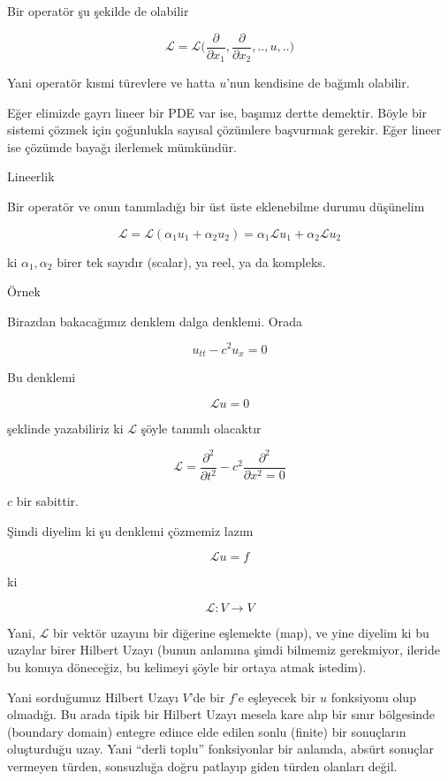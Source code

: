 \documentclass[12pt,fleqn]{article}\usepackage{../../common}
\begin{document}
Bir operatör şu şekilde de olabilir

$$ \mathcal{L} = \mathcal{L} \bigg(
\frac{\partial }{\partial x_1}, \frac{\partial }{\partial x_2},..,
u,..
\bigg)
 $$

Yani operatör kısmi türevlere ve hatta $u$'nun kendisine de bağımlı
olabilir. 

Eğer elimizde gayrı lineer bir PDE var ise, başımız dertte demektir. Böyle
bir sistemi çözmek için çoğunlukla sayısal çözümlere başvurmak
gerekir. Eğer lineer ise çözümde bayağı ilerlemek mümkündür. 

Lineerlik

Bir operatör ve onun tanımladığı bir üst üste eklenebilme durumu düşünelim

$$ \mathcal{L} = \mathcal{L}(\alpha_1 u_1 + \alpha_2 u_2) = 
\alpha_1 \mathcal{L}u_1 + \alpha_2 \mathcal{L}u_2 $$

ki $\alpha_1,\alpha_2$ birer tek sayıdır (scalar), ya reel, ya da kompleks. 

Örnek

Birazdan bakacağımız denklem dalga denklemi. Orada

$$ u_{tt} - c^2u_x = 0 $$

Bu denklemi

$$ \mathcal{L}u = 0 $$

şeklinde yazabiliriz ki $\mathcal{L}$ şöyle tanımlı olacaktır

$$ \mathcal{L} = \frac{\partial^2}{\partial t^2} - 
c^2 \frac{\partial ^2}{\partial x^2 = 0}$$

$c$ bir sabittir. 

Şimdi diyelim ki şu denklemi çözmemiz lazım

$$\mathcal{L} u = f $$

ki

$$ \mathcal{L}: V \to V $$

Yani, $\mathcal{L}$ bir vektör uzayını bir diğerine eşlemekte (map), ve yine diyelim
ki bu uzaylar birer Hilbert Uzayı (bunun anlamına şimdi bilmemiz
gerekmiyor, ileride bu konuya döneceğiz, bu kelimeyi şöyle bir ortaya atmak
istedim). 

Yani sorduğumuz Hilbert Uzayı $V$'de bir $f$'e eşleyecek bir $u$ fonksiyonu
olup olmadığı. Bu arada tipik bir Hilbert Uzayı mesela kare alıp bir sınır
bölgesinde (boundary domain) entegre edince elde edilen sonlu (finite) bir
sonuçların oluşturduğu uzay. Yani ``derli toplu'' fonksiyonlar bir anlamda,
absürt sonuçlar vermeyen türden, sonsuzluğa doğru patlayıp giden türden
olanları değil. 
\end{document}
